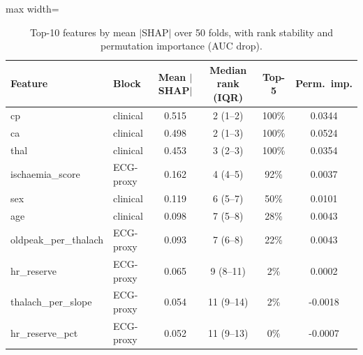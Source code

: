 \begin{table}[!t]
\centering
\scriptsize
\caption{Top-10 features by mean $|$SHAP$|$ over 50 folds, with rank stability and permutation importance (AUC drop).}
\label{tab:shaptop}
\setlength{\tabcolsep}{3pt}
\begin{adjustbox}{max width=\linewidth}
\begin{tabular}{llcccc}
\toprule
Feature & Block & Mean $|$SHAP$|$ & Median rank (IQR) & Top-5 & Perm.\ imp. \\
\midrule
cp & clinical & 0.515 & 2 (1--2) & 100\% & 0.0344 \\
ca & clinical & 0.498 & 2 (1--3) & 100\% & 0.0524 \\
thal & clinical & 0.453 & 3 (2--3) & 100\% & 0.0354 \\
ischaemia\_score & ECG-proxy & 0.162 & 4 (4--5) & 92\% & 0.0037 \\
sex & clinical & 0.119 & 6 (5--7) & 50\% & 0.0101 \\
age & clinical & 0.098 & 7 (5--8) & 28\% & 0.0043 \\
oldpeak\_per\_thalach & ECG-proxy & 0.093 & 7 (6--8) & 22\% & 0.0043 \\
hr\_reserve & ECG-proxy & 0.065 & 9 (8--11) & 2\% & 0.0002 \\
thalach\_per\_slope & ECG-proxy & 0.054 & 11 (9--14) & 2\% & -0.0018 \\
hr\_reserve\_pct & ECG-proxy & 0.052 & 11 (9--13) & 0\% & -0.0007 \\
\bottomrule
\end{tabular}
\end{adjustbox}
\end{table}

